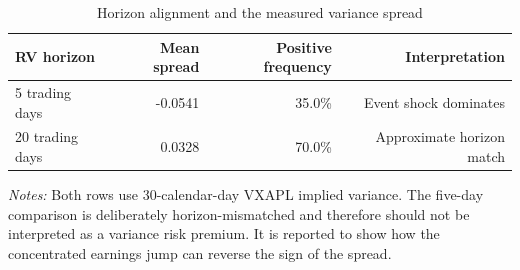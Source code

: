\begin{table}[!htbp]
\centering
\caption{Horizon alignment and the measured variance spread}
\label{tab:horizon}
\small
\begin{tabular}{lrrr}
\toprule
RV horizon & Mean spread & Positive frequency & Interpretation \\
\midrule
5 trading days & -0.0541 & 35.0\% & Event shock dominates \\
20 trading days & 0.0328 & 70.0\% & Approximate horizon match \\
\bottomrule
\end{tabular}
\begin{minipage}{0.92\linewidth}
\footnotesize \textit{Notes:} Both rows use 30-calendar-day VXAPL implied variance. The five-day comparison is deliberately horizon-mismatched and therefore should not be interpreted as a variance risk premium. It is reported to show how the concentrated earnings jump can reverse the sign of the spread.
\end{minipage}
\end{table}
